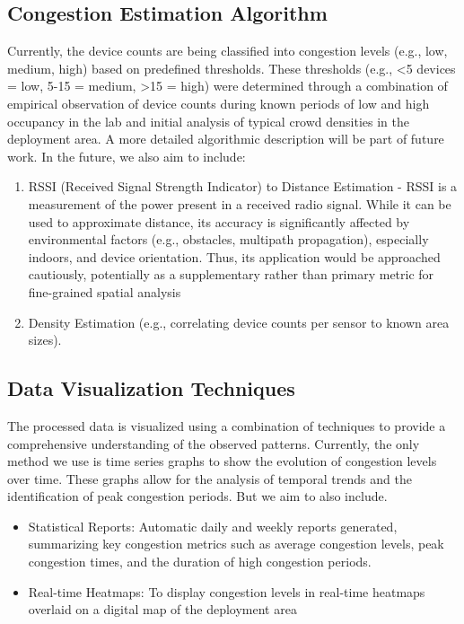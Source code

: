 \documentclass[runningheads]{llncs}
\begin{document}
\subsection{Congestion Estimation Algorithm}
Currently, the device counts are being classified into congestion levels (e.g., low, medium, high) based on predefined thresholds. These thresholds (e.g., <5 devices = low, 5-15 = medium, >15 = high) were determined through a combination of empirical observation of device counts during known periods of low and high occupancy in the lab and initial analysis of typical crowd densities in the deployment area. A more detailed algorithmic description will be part of future work. In the future, we also aim to include:
\begin{enumerate}
    \item RSSI (Received Signal Strength Indicator) to Distance Estimation - RSSI is a measurement of the power present in a received radio signal. While it can be used to approximate distance, its accuracy is significantly affected by environmental factors (e.g., obstacles, multipath propagation), especially indoors, and device orientation\cite{Zafari_Localization}. Thus, its application would be approached cautiously, potentially as a supplementary rather than primary metric for fine-grained spatial analysis
    \item Density Estimation (e.g., correlating device counts per sensor to known area sizes).
\end{enumerate}




\subsection{Data Visualization Techniques} 
The processed data is visualized using a combination of techniques to provide a comprehensive understanding of the observed patterns.
Currently, the only method we use is time series graphs to show the evolution of congestion levels over time. These graphs allow for the analysis of temporal trends and the identification of peak congestion periods.
But we aim to also include. 
\begin{itemize}
    \item Statistical Reports: Automatic daily and weekly reports  generated, summarizing key congestion metrics such as average congestion levels, peak congestion times, and the duration of high congestion periods.
    \item Real-time Heatmaps: To display congestion levels in real-time heatmaps overlaid on a digital map of the deployment area

\end{itemize}
\end{document}

